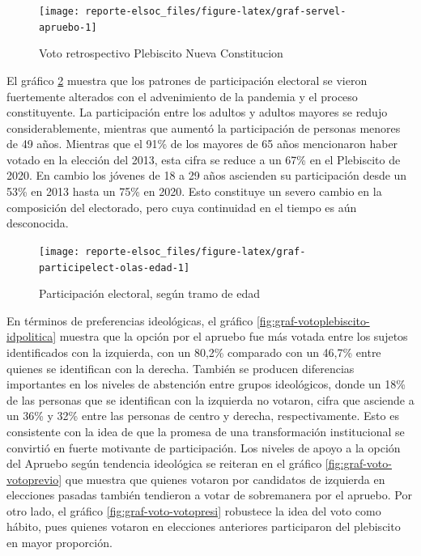 \documentclass[
  12pt,
]{book}
\begin{document}
\begin{figure}

{\centering \texttt{[image: reporte-elsoc\_files/figure-latex/graf-servel-apruebo-1]} 

}

\caption{Voto retrospectivo Plebiscito Nueva Constitucion}\label{fig:graf-servel-apruebo}
\end{figure}

El gráfico \ref{fig:graf-participelect-olas-edad} muestra que los patrones de participación electoral se vieron fuertemente alterados con el advenimiento de la pandemia y el proceso constituyente. La participación entre los adultos y adultos mayores se redujo considerablemente, mientras que aumentó la participación de personas menores de 49 años. Mientras que el 91\% de los mayores de 65 años mencionaron haber votado en la elección del 2013, esta cifra se reduce a un 67\% en el Plebiscito de 2020. En cambio los jóvenes de 18 a 29 años ascienden su participación desde un 53\% en 2013 hasta un 75\% en 2020. Esto constituye un severo cambio en la composición del electorado, pero cuya continuidad en el tiempo es aún desconocida.

\begin{figure}

{\centering \texttt{[image: reporte-elsoc\_files/figure-latex/graf-participelect-olas-edad-1]} 

}

\caption{Participación electoral, según tramo de edad}\label{fig:graf-participelect-olas-edad}
\end{figure}

En términos de preferencias ideológicas, el gráfico \ref{fig:graf-votoplebiscito-idpolitica} muestra que la opción por el apruebo fue más votada entre los sujetos identificados con la izquierda, con un 80,2\% comparado con un 46,7\% entre quienes se identifican con la derecha. También se producen diferencias importantes en los niveles de abstención entre grupos ideológicos, donde un 18\% de las personas que se identifican con la izquierda no votaron, cifra que asciende a un 36\% y 32\% entre las personas de centro y derecha, respectivamente. Esto es consistente con la idea de que la promesa de una transformación institucional se convirtió en fuerte motivante de participación. Los niveles de apoyo a la opción del Apruebo según tendencia ideológica se reiteran en el gráfico \ref{fig:graf-voto-votoprevio} que muestra que quienes votaron por candidatos de izquierda en elecciones pasadas también tendieron a votar de sobremanera por el apruebo. Por otro lado, el gráfico \ref{fig:graf-voto-votopresi} robustece la idea del voto como hábito, pues quienes votaron en elecciones anteriores participaron del plebiscito en mayor proporción.
\end{document}
